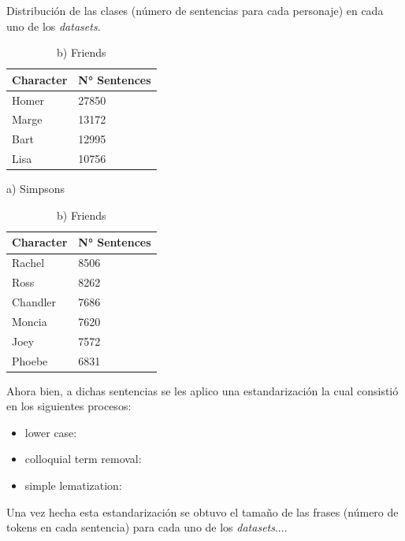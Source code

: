 \begin{table}[H]
\caption{Distribución de las clases (número de sentencias para cada personaje) en cada uno de los \textit{datasets}.}
\label{tab:dist-datos}
\centering
\begin{minipage}{0.45\textwidth}
\centering
\begin{tabular}{|l|l|}
\hline
\textbf{Character} & \textbf{N° Sentences} \\ \hline
Homer & 27850 \\ \hline
Marge & 13172 \\ \hline
Bart & 12995 \\ \hline
Lisa & 10756 \\ \hline
\end{tabular}
\caption*{a) Simpsons }

\end{minipage}\hfill
\begin{minipage}{0.45\textwidth}
\centering
\begin{tabular}{|l|l|}
\hline
\textbf{Character} & \textbf{N° Sentences} \\ \hline
Rachel & 8506 \\ \hline
Ross & 8262 \\ \hline
Chandler & 7686 \\ \hline
Moncia & 7620 \\ \hline
Joey & 7572 \\ \hline
Phoebe & 6831 \\ \hline
\end{tabular}
\caption*{b) Friends}

\end{minipage}

\end{table}

Ahora bien, a dichas sentencias se les aplico una estandarización la cual consistió en los siguientes procesos:

\begin{itemize}
    \item lower case:
    
    \item colloquial term removal:
    
    \item simple lematization:
\end{itemize}

Una vez hecha esta estandarización se obtuvo el tamaño de las frases (número de tokens en cada sentencia) para cada uno de los \textit{datasets}.... \\

